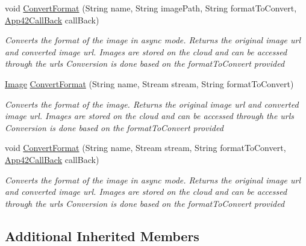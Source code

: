 \begin{DoxyCompactItemize}
void \hyperlink{classcom_1_1shephertz_1_1app42_1_1paas_1_1sdk_1_1csharp_1_1image_processor_1_1_image_processor_service_aaafdb3ff235f7703a1867ece1fe4db68}{Convert\+Format} (String name, String image\+Path, String format\+To\+Convert, \hyperlink{interfacecom_1_1shephertz_1_1app42_1_1paas_1_1sdk_1_1csharp_1_1_app42_call_back}{App42\+Call\+Back} call\+Back)
\begin{DoxyCompactList}\small\item\em Converts the format of the image in async mode. Returns the original image url and converted image url. Images are stored on the cloud and can be accessed through the urls Conversion is done based on the format\+To\+Convert provided \end{DoxyCompactList}\item 
\hyperlink{classcom_1_1shephertz_1_1app42_1_1paas_1_1sdk_1_1csharp_1_1image_processor_1_1_image}{Image} \hyperlink{classcom_1_1shephertz_1_1app42_1_1paas_1_1sdk_1_1csharp_1_1image_processor_1_1_image_processor_service_a2ecbbef06d20e98af2be9836574d463b}{Convert\+Format} (String name, Stream stream, String format\+To\+Convert)
\begin{DoxyCompactList}\small\item\em Converts the format of the image. Returns the original image url and converted image url. Images are stored on the cloud and can be accessed through the urls Conversion is done based on the format\+To\+Convert provided \end{DoxyCompactList}\item 
void \hyperlink{classcom_1_1shephertz_1_1app42_1_1paas_1_1sdk_1_1csharp_1_1image_processor_1_1_image_processor_service_a67b03b134703c664e18c8234e1cd7ba1}{Convert\+Format} (String name, Stream stream, String format\+To\+Convert, \hyperlink{interfacecom_1_1shephertz_1_1app42_1_1paas_1_1sdk_1_1csharp_1_1_app42_call_back}{App42\+Call\+Back} call\+Back)
\begin{DoxyCompactList}\small\item\em Converts the format of the image in async mode. Returns the original image url and converted image url. Images are stored on the cloud and can be accessed through the urls Conversion is done based on the format\+To\+Convert provided \end{DoxyCompactList}\end{DoxyCompactItemize}
\subsection*{Additional Inherited Members}


